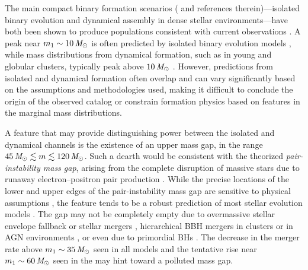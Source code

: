 The main compact binary formation scenarios (\citealt{Mandel:2018hfr} and references therein)---isolated binary evolution and dynamical assembly in dense stellar environments---have both been shown to produce populations consistent with current observations \citep{Mandel:2021smh}. A peak near $m_1 \sim 10 \, \mathit{M_\odot}$ is often predicted by isolated binary evolution models \citep{Dominik:2014yma, Belczynski:2017gds, Giacobbo:2018etu, Wiktorowicz:2019dil, Neijssel:2019irh}, while mass distributions from dynamical formation, such as in young and globular clusters, typically peak above $10\, \mathit{M_\odot}$ \citep{Rodriguez:2016kxx, Hong:2018bqs, Rodriguez:2019huv, Banerjee:2020qub, Antonini:2020xnd}. However, predictions from isolated and dynamical formation often overlap and can vary significantly based on the assumptions and methodologies used, making it difficult to conclude the origin of the observed catalog or constrain formation physics based on features in the marginal mass distributions. 

A feature that may provide distinguishing power between the isolated and dynamical channels is the existence of an upper mass gap, in the range $45\,\mathit{M_\odot} \lesssim m \lesssim 120 \,\mathit{M_\odot}$. Such a dearth would be consistent with the theorized \textit{pair-instability mass gap}, arising from the complete disruption of massive stars due to runaway electron--positron pair production \citep{Woosley:2016hmi,Mapelli:2019ipt,Farmer:2019jed}. While the precise locations of the lower and upper edges of the pair-instability mass gap are sensitive to physical assumptions \citep{Renzo:2020rzx, vanSon:2020zbk, Woosley:2021xba, Shen:2023rco, Winch:2024xdt}, the feature tends to be a robust prediction of most stellar evolution models \citep{Marchant:2018kun,Marchant:2020haw,Renzo:2020rzx,Woosley:2021xba}. The gap may not be completely empty due to overmassive stellar envelope fallback or stellar mergers \citep{DiCarlo:2019pmf, DiCarlo:2019fcq, Mapelli:2019ipt, Kremer:2020wtp}, hierarchical BBH mergers in clusters or in AGN environments \citep{Mckernan:2017ssq, Rodriguez:2019huv, McKernan:2019beu, Yang:2019okq, Mapelli:2020xeq, Antonini:2018auk, Fragione:2020nib, Liu:2020gif, Martinez:2020lzt, Sedda:2020jvg, Mahapatra:2021hme, Mahapatra:2022ngs, Mahapatra:2024qsy}, or even due to primordial \acp{BH} \citep{Postnov:2014tza, Bird:2016dcv, Clesse:2020ghq}. The decrease in the merger rate above $m_1 \sim35 \, \mathit{M_\odot}$ seen in all models and the tentative rise near $m_1\sim60 \, \mathit{M_\odot}$ seen in the \nonparametrics may hint toward a polluted mass gap.


